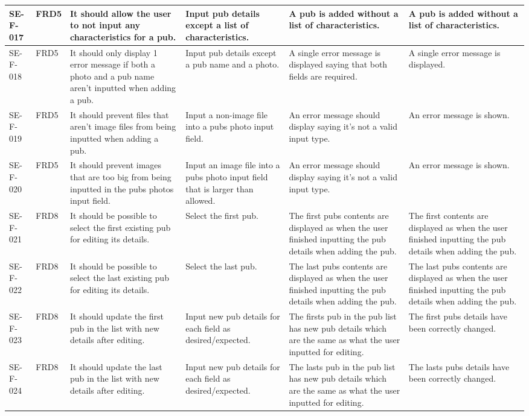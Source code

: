 \documentclass{project}
\begin{document}
\begin{center}
\begin{longtable}[c]{| p{1.6cm} | p{1cm} | p{3.5cm} |p{3.3cm} | p{3.3cm} | p{3.0cm} |}
 \hline
 SE-F-017 &FRD5 &It should allow the user to not input any characteristics for a pub.& Input pub details except a list of characteristics.& A pub is added without a list of characteristics.&A pub is added without a list of characteristics. \\
 \hline
 SE-F-018 &FRD5 &It should only display 1 error message if both a photo and a pub name aren’t inputted when adding a pub. & Input pub details except a pub name and a photo.& A single error message is displayed saying that both fields are required.&A single error message is displayed. \\
 \hline
 SE-F-019 &FRD5 &It should prevent files that aren’t image files from being inputted when adding a pub. &Input a non-image file into a pubs photo input field. &An error message should display saying it’s not a valid input type. &An error message is shown. \\
 \hline
 SE-F-020 &FRD5 &It should prevent images that are too big from being inputted in the pubs photos input field. &Input an image file into a pubs photo input field that is larger than allowed. &An error message should display saying it’s not a valid input type. &An error message is shown. \\
 \hline
 SE-F-021 &FRD8 & It should be possible to select the first existing pub for editing its details.&Select the first pub. &The first pubs contents are displayed as when the user finished inputting the pub details when adding the pub. &The first contents are displayed as when the user finished inputting the pub details when adding the pub. \\
 \hline
 SE-F-022 &FRD8 &It should be possible to select the last existing pub for editing its details. &Select the last pub. &The last pubs contents are displayed as when the user finished inputting the pub details when adding the pub. &The last pubs contents are displayed as when the user finished inputting the pub details when adding the pub. \\
 \hline
 SE-F-023 &FRD8 &It should update the first pub in the list with new details after editing. &Input new pub details for each field as desired/expected. &The firsts pub in the pub list has new pub details which are the same as what the user inputted for editing. &The first pubs details have been correctly changed. \\
 \hline
 SE-F-024 &FRD8 &It should update the last pub in the list with new details after editing. & Input new pub details for each field as desired/expected.&The lasts pub in the pub list has new pub details which are the same as what the user inputted for editing. &The lasts pubs details have been correctly changed. \\

\end{longtable}
\end{center}
\end{document}
